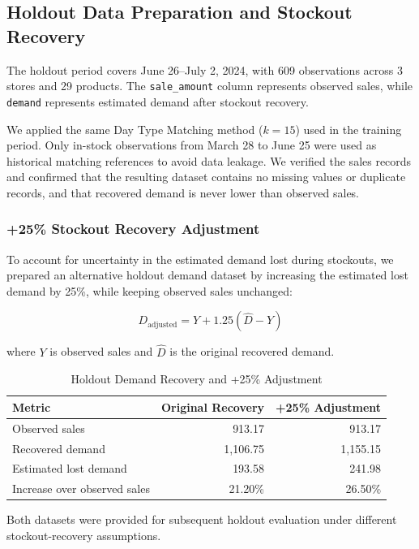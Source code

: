 
\subsection{Holdout Data Preparation and Stockout Recovery}

The holdout period covers June 26--July 2, 2024, with 609 observations across 3 stores and 29 products. The \texttt{sale\_amount} column represents observed sales, while \texttt{demand} represents estimated demand after stockout recovery.

We applied the same Day Type Matching method ($k=15$) used in the training period. Only in-stock observations from March 28 to June 25 were used as historical matching references to avoid data leakage. We verified the sales records and confirmed that the resulting dataset contains no missing values or duplicate records, and that recovered demand is never lower than observed sales.

\subsubsection{+25\% Stockout Recovery Adjustment}

To account for uncertainty in the estimated demand lost during stockouts, we prepared an alternative holdout demand dataset by increasing the estimated lost demand by 25\%, while keeping observed sales unchanged:

\begin{equation}
D_{\mathrm{adjusted}}
=Y+1.25(\widehat{D}-Y)
\end{equation}

where $Y$ is observed sales and $\widehat{D}$ is the original recovered demand.

\begin{table}[htbp]
\centering
\caption{Holdout Demand Recovery and +25\% Adjustment}
\label{tab:recovery_adjustment}
\begin{tabular}{lrr}
\hline
Metric & Original Recovery & +25\% Adjustment \\
\hline
Observed sales & 913.17 & 913.17 \\
Recovered demand & 1,106.75 & 1,155.15 \\
Estimated lost demand & 193.58 & 241.98 \\
Increase over observed sales & 21.20\% & 26.50\% \\
\hline
\end{tabular}
\end{table}

Both datasets were provided for subsequent holdout evaluation under different stockout-recovery assumptions.
